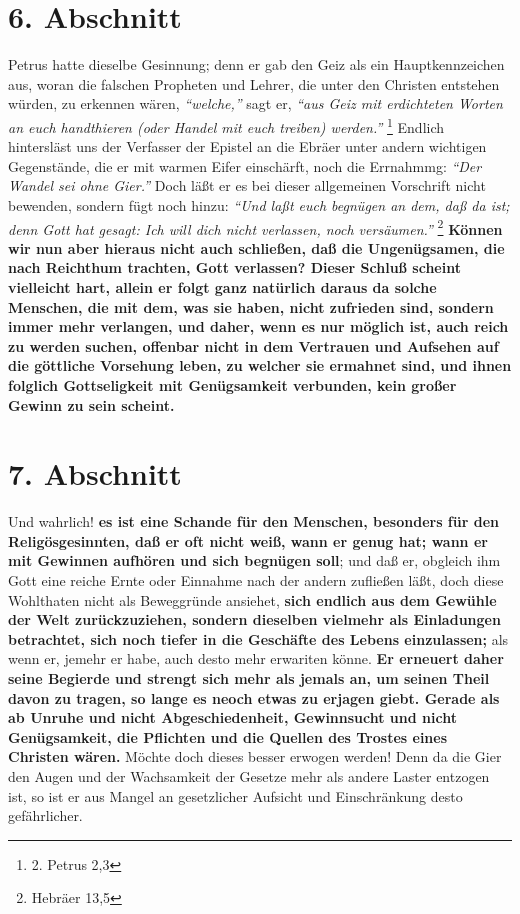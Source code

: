 \section{6. Abschnitt} \label{kap13_ab6}

Petrus  hatte dieselbe Gesinnung; denn er gab den Geiz als ein Hauptkennzeichen
aus, woran die falschen Propheten und Lehrer, die unter den Christen entstehen
würden, zu erkennen wären,  \textit{"`welche,"'} sagt er, \textit{"`aus Geiz mit erdichteten
Worten an euch handthieren (oder Handel mit euch treiben) werden."'}
\footnote{2. Petrus 2,3}
Endlich hintersläst uns der Verfasser der Epistel an die Ebräer
unter andern wichtigen Gegenstände, die er mit warmen Eifer einschärft, noch die
Errnahmmg: \textit{"`Der Wandel sei ohne Gier."'} Doch läßt er es bei dieser allgemeinen
Vorschrift nicht bewenden, sondern fügt noch hinzu:
\textit{"`Und laßt euch begnügen an
dem, daß da ist; denn Gott hat gesagt: Ich will dich nicht verlassen, noch
versäumen."'}
\footnote{Hebräer 13,5}
\textbf{Können wir nun aber hieraus nicht auch
schließen, daß die Ungenügsamen, die nach Reichthum trachten, Gott verlassen?
Dieser Schluß scheint vielleicht hart, allein er folgt ganz natürlich daraus da
solche Menschen, die mit dem, was sie haben, nicht zufrieden sind, sondern immer
mehr verlangen, und daher, wenn es nur möglich ist, auch reich zu werden suchen,
offenbar nicht in dem Vertrauen und Aufsehen auf die göttliche Vorsehung leben,
zu welcher sie ermahnet sind, und ihnen folglich Gottseligkeit mit Genügsamkeit
verbunden, kein großer Gewinn zu sein scheint.}

\section{7. Abschnitt} \label{kap13_ab7} 

  Und wahrlich! \textbf{es ist eine Schande für den Menschen, besonders für den
Religösgesinnten, daß er oft nicht weiß, wann er genug hat; wann er mit Gewinnen
aufhören und sich begnügen soll}; und daß er, obgleich ihm Gott eine reiche Ernte
oder Einnahme nach der andern zufließen läßt, doch diese Wohlthaten nicht als
Beweggründe ansiehet, \textbf{sich endlich aus dem Gewühle der Welt zurückzuziehen,
sondern dieselben vielmehr als Einladungen betrachtet, sich noch tiefer in die
Geschäfte des Lebens einzulassen;} als wenn er, jemehr er habe, auch desto mehr
erwariten könne. \textbf{Er erneuert daher seine Begierde und strengt sich mehr als
jemals an, um seinen Theil davon zu tragen, so lange es neoch etwas zu erjagen
giebt. Gerade als ab Unruhe und nicht Abgeschiedenheit, Gewinnsucht und nicht
Genügsamkeit, die Pflichten und die Quellen des Trostes eines Christen wären.}
Möchte doch dieses besser erwogen werden! Denn da die Gier den Augen und der
Wachsamkeit der Gesetze mehr als andere Laster entzogen ist, so ist er aus
 Mangel an gesetzlicher Aufsicht und Einschränkung desto gefährlicher.

